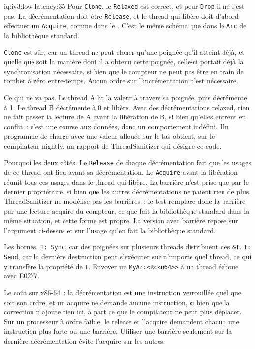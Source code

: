\begin{solution}{iq:iv3:low-latency:35}
Pour \texttt{Clone}, le \texttt{Relaxed} est correct, et pour \texttt{Drop} il ne l'est pas. La décrémentation doit être \texttt{Release}, et le thread qui libère doit d'abord effectuer un \texttt{Acquire}, comme dans le . C'est le même schéma que dans le \texttt{Arc} de la bibliothèque standard.
\label{lst:iv3:ll:arcdrop}

\texttt{Clone} est sûr, car un thread ne peut cloner qu'une poignée qu'il atteint déjà, et quelle que soit la manière dont il a obtenu cette poignée, celle-ci portait déjà la synchronisation nécessaire, si bien que le compteur ne peut pas être en train de tomber à zéro entre-temps. Aucun ordre sur l'incrémentation n'est nécessaire.

Ce qui ne va pas. Le thread A lit la valeur à travers sa poignée, puis décrémente à 1. Le thread B décrémente à 0 et libère. Avec des décrémentations relaxed, rien ne fait passer la lecture de A avant la libération de B, si bien qu'elles entrent en conflit~: c'est une course aux données, donc un comportement indéfini. Un programme de charge avec une valeur allouée sur le tas obtient, sur le compilateur nightly, un rapport de ThreadSanitizer qui désigne ce code.

Pourquoi les deux côtés. Le \texttt{Release} de chaque décrémentation fait que les usages de ce thread ont lieu avant sa décrémentation. Le \texttt{Acquire} avant la libération réunit tous ces usages dans le thread qui libère. La barrière n'est prise que par le dernier propriétaire, si bien que les autres décrémentations ne paient rien de plus. ThreadSanitizer ne modélise pas les barrières~: le test remplace donc la barrière par une lecture acquire du compteur, ce que fait la bibliothèque standard dans la même situation, et cette forme est propre. La version avec barrière repose sur l'argument ci-dessus et sur l'usage qu'en fait la bibliothèque standard.

Les bornes. \texttt{T: Sync}, car des poignées sur plusieurs threads distribuent des \texttt{\&T}. \texttt{T: Send}, car la dernière destruction peut s'exécuter sur n'importe quel thread, ce qui y transfère la propriété de \texttt{T}. Envoyer un \texttt{MyArc<Rc<u64>{}>} à un thread échoue avec E0277.

Le coût sur x86-64~: la décrémentation est une instruction verrouillée quel que soit son ordre, et un acquire ne demande aucune instruction, si bien que la correction n'ajoute rien ici, à part ce que le compilateur ne peut plus déplacer. Sur un processeur à ordre faible, le release et l'acquire demandent chacun une instruction plus forte ou une barrière. Utiliser une barrière seulement sur la dernière décrémentation évite l'acquire sur les autres.

\end{solution}
